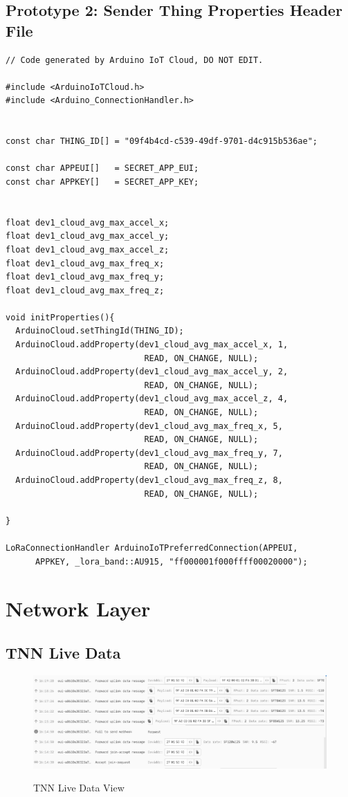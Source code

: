 \subsection{Prototype 2: Sender Thing Properties Header File}
\begin{verbatim}
// Code generated by Arduino IoT Cloud, DO NOT EDIT.

#include <ArduinoIoTCloud.h>
#include <Arduino_ConnectionHandler.h>


const char THING_ID[] = "09f4b4cd-c539-49df-9701-d4c915b536ae";

const char APPEUI[]   = SECRET_APP_EUI;
const char APPKEY[]   = SECRET_APP_KEY;


float dev1_cloud_avg_max_accel_x;
float dev1_cloud_avg_max_accel_y;
float dev1_cloud_avg_max_accel_z;
float dev1_cloud_avg_max_freq_x;
float dev1_cloud_avg_max_freq_y;
float dev1_cloud_avg_max_freq_z;

void initProperties(){
  ArduinoCloud.setThingId(THING_ID);
  ArduinoCloud.addProperty(dev1_cloud_avg_max_accel_x, 1,
                            READ, ON_CHANGE, NULL);
  ArduinoCloud.addProperty(dev1_cloud_avg_max_accel_y, 2,
                            READ, ON_CHANGE, NULL);
  ArduinoCloud.addProperty(dev1_cloud_avg_max_accel_z, 4,
                            READ, ON_CHANGE, NULL);
  ArduinoCloud.addProperty(dev1_cloud_avg_max_freq_x, 5, 
                            READ, ON_CHANGE, NULL);
  ArduinoCloud.addProperty(dev1_cloud_avg_max_freq_y, 7, 
                            READ, ON_CHANGE, NULL);
  ArduinoCloud.addProperty(dev1_cloud_avg_max_freq_z, 8, 
                            READ, ON_CHANGE, NULL);

}

LoRaConnectionHandler ArduinoIoTPreferredConnection(APPEUI,  
      APPKEY, _lora_band::AU915, "ff000001f000ffff00020000");
\end{verbatim}

\section{Network Layer}
\subsection{TNN Live Data}
\begin{figure}[H]
	\centering
	\caption{TNN Live Data View}
	\includegraphics[width=\textwidth]{Sections/Appendix/TNN-live.png}
	\label{tnn-live}
\end{figure}

